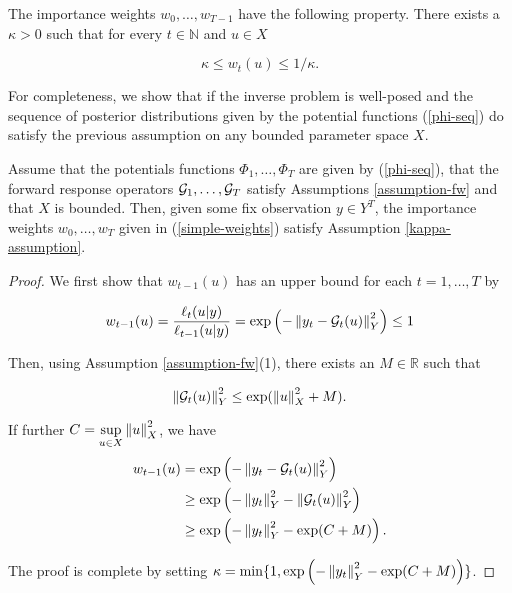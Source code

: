 \begin{assumption}\label{kappa-assumption}
  The importance weights $w_0, \ldots, w_{T-1}$ have the following property. There exists a $\kappa > 0$ such that for every $t \in \mathbb{N}$ and $u \in X$

  \begin{equation*}
    \kappa \leq w_t(u) \leq 1/\kappa.
  \end{equation*}
\end{assumption}

For completeness, we show that if the inverse problem is well-posed and the sequence of posterior distributions given by the potential functions (\ref{phi-seq}) do satisfy the previous assumption on any bounded parameter space $X$.

\begin{lemma}\label{easy-lemma}
  Assume that the potentials functions $\Phi_1, \ldots, \Phi_T$ are given by (\ref{phi-seq}), that the forward response operators $\mathcal{G}_1, \ldots, \mathcal{G}_T$ satisfy Assumptions \ref{assumption-fw} and that $X$ is bounded. Then, given some fix observation $y \in Y^T$, the importance weights $w_0, \ldots, w_T$ given in (\ref{simple-weights}) satisfy Assumption \ref{kappa-assumption}.
\end{lemma}

\begin{proof}
  We first show that $w_{t-1}(u)$ has an upper bound for each $t = 1, \ldots, T$ by

  \begin{equation*}
    w_{t-1}(u)
    = \frac{\ell_t(u|y)}{\ell_{t-1}(u|y)}
    = \exp\left(-\left\lVert y_t - \mathcal{G}_t(u)\right\rVert_Y^2\right) \le 1
  \end{equation*}

  Then, using Assumption \ref{assumption-fw}(1), there exists an $M \in \mathbb{R}$ such that
  
  \begin{equation*}
    \left\lVert\mathcal{G}_t(u)\right\rVert_Y^2 \le \exp(\left\lVert u\right\rVert_X^2 + M).
  \end{equation*}

  If further $C = \underset{u \in X}{\sup} \left\lVert u\right\rVert_X^2$, we have
  \begin{align*}
    w_{t-1}(u)
    &= \exp\left(-\left\lVert y_t - \mathcal{G}_t(u)\right\rVert_Y^2\right)\\
    &\ge \exp\left(-\left\lVert y_t\right\rVert_Y^2 - \left\lVert\mathcal{G}_t(u)\right\rVert_Y^2\right)\\
    &\ge \exp\left(-\left\lVert y_t\right\rVert_Y^2 - \exp(C+M)\right).
  \end{align*}

  The proof is complete by setting $\kappa = \min\{1, \exp\left(-\left\lVert y_t\right\rVert_Y^2 - \exp(C+M)\right)\}$.
\end{proof}

